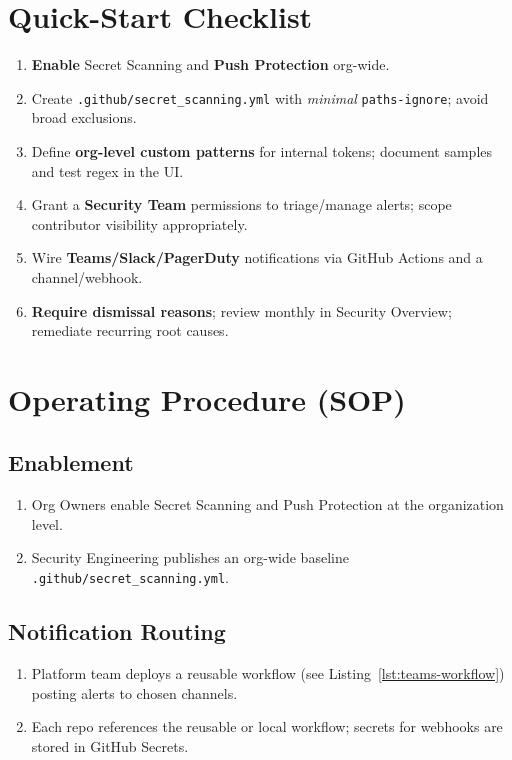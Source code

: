 \documentclass[11pt,a4paper]{article}
\begin{document}
\section{Quick-Start Checklist}
\begin{enumerate}
  \item \textbf{Enable} Secret Scanning and \textbf{Push Protection} org-wide.
  \item Create \texttt{.github/secret\_scanning.yml} with \emph{minimal} \texttt{paths-ignore}; avoid broad exclusions.
  \item Define \textbf{org-level custom patterns} for internal tokens; document samples and test regex in the UI.
  \item Grant a \textbf{Security Team} permissions to triage/manage alerts; scope contributor visibility appropriately.
  \item Wire \textbf{Teams/Slack/PagerDuty} notifications via GitHub Actions and a channel/webhook.
  \item \textbf{Require dismissal reasons}; review monthly in Security Overview; remediate recurring root causes.
\end{enumerate}

\section{Operating Procedure (SOP)}
\subsection{Enablement}
\begin{enumerate}[label=\alph*)]
  \item Org Owners enable Secret Scanning and Push Protection at the organization level.
  \item Security Engineering publishes an org-wide baseline \texttt{.github/secret\_scanning.yml}.
\end{enumerate}

\subsection{Notification Routing}
\begin{enumerate}[label=\alph*)]
  \item Platform team deploys a reusable workflow (see Listing~\ref{lst:teams-workflow}) posting alerts to chosen channels.
  \item Each repo references the reusable or local workflow; secrets for webhooks are stored in GitHub Secrets.
\end{enumerate}
\end{document}
